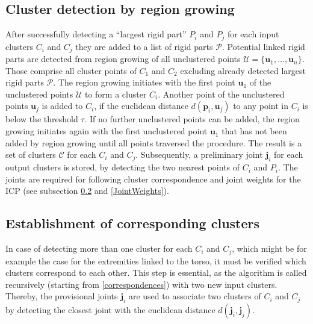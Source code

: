 \subsection{Cluster detection by region growing}
\label{cluster}
After successfully detecting a ``largest rigid part'' $P_i$ and $P_j$ for each input clusters $C_i$ and $C_j$ they are added to a list of rigid parts $\mathcal{P}$. Potential linked rigid parts are detected from region growing of all unclustered points $\mathcal{U} =  \{\boldsymbol{u}_1,\ldots,\boldsymbol{u}_n\}$. Those comprise all cluster points of $C_1$ and $C_2$ excluding already detected largest rigid parts $\mathcal{P}$. The region growing initiates with the first point $\boldsymbol{u}_1$ of the unclustered points $\mathcal{U}$ to form a cluster $C_i$. Another point of the unclustered points $\boldsymbol{u}_j$ is added to $C_i$, if the euclidean distance $d(\boldsymbol{p}_i,\boldsymbol{u}_j)$ to any point in $C_i$ is below the threshold $\tau$. If no further unclustered points can be added, the region growing initiates again with the first unclustered point $\boldsymbol{u}_1$ that has not been added by region growing until all points traversed the procedure. The result is a set of clusters $\mathcal{C}$ for each $C_i$ and $C_j$. Subsequently, a preliminary joint $\boldsymbol{j}_i$ for each output clusters is stored, by detecting the two nearest points of $C_i$ and $P_i$. The joints are required for following cluster correspondence and joint weights for the ICP (see subsection \ref{CorrespondingClusters} and \ref{JointWeights}).

\subsection{Establishment of corresponding clusters}
\label{CorrespondingClusters}
In case of detecting more than one cluster for each $C_i$ and $C_j$, which might be for example the case for the extremities linked to the torso, it must be verified which clusters correspond to each other. This step is essential, as the algorithm is called recursively (starting from \ref{correspondences}) with two new input clusters. Thereby, the provisional joints $\boldsymbol{j}_i$ are used to associate two clusters of $C_i$ and $C_j$ by detecting the closest joint with the euclidean distance $d(\boldsymbol{j}_i,\boldsymbol{j}_j)$.


